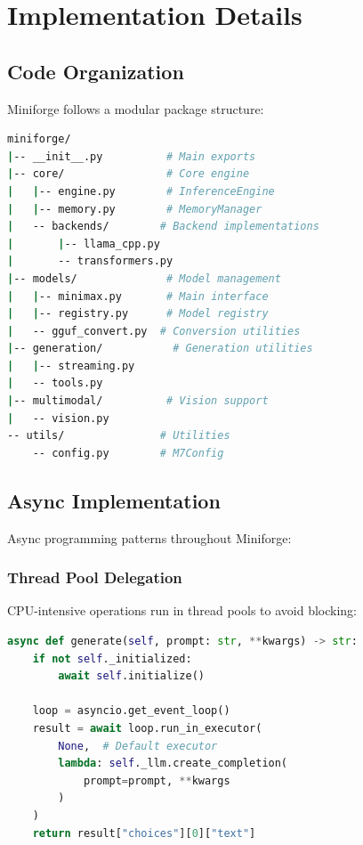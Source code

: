 \section{Implementation Details}
\label{sec:implementation}

\subsection{Code Organization}

Miniforge follows a modular package structure:

\begin{lstlisting}[language=bash, caption=Package Structure]
miniforge/
|-- __init__.py          # Main exports
|-- core/                # Core engine
|   |-- engine.py        # InferenceEngine
|   |-- memory.py        # MemoryManager
|   -- backends/        # Backend implementations
|       |-- llama_cpp.py
|       -- transformers.py
|-- models/              # Model management
|   |-- minimax.py       # Main interface
|   |-- registry.py      # Model registry
|   -- gguf_convert.py  # Conversion utilities
|-- generation/           # Generation utilities
|   |-- streaming.py
|   -- tools.py
|-- multimodal/          # Vision support
|   -- vision.py
-- utils/               # Utilities
    -- config.py        # M7Config
\end{lstlisting}

\subsection{Async Implementation}

Async programming patterns throughout Miniforge:

\subsubsection{Thread Pool Delegation}

CPU-intensive operations run in thread pools to avoid blocking:

\begin{lstlisting}[language=Python, caption=Thread Pool Pattern]
async def generate(self, prompt: str, **kwargs) -> str:
    if not self._initialized:
        await self.initialize()
    
    loop = asyncio.get_event_loop()
    result = await loop.run_in_executor(
        None,  # Default executor
        lambda: self._llm.create_completion(
            prompt=prompt, **kwargs
        )
    )
    return result["choices"][0]["text"]
\end{lstlisting}

